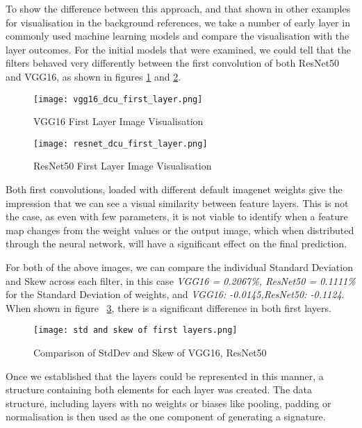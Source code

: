 To show the difference between this approach, and that shown in other examples for visualisation in the background references, we take a number of early layer in commonly used machine learning models and compare the visualisation with the layer outcomes. For the initial models that were examined, we could tell that the filters behaved very differently between the first convolution of both ResNet50 and VGG16, as shown in figures \ref{fig:vgg16_dcu_image} and \ref{fig:resnet50_dcu_image}.

\begin{figure}[!ht]
    \centering
    \texttt{[image: vgg16\_dcu\_first\_layer.png]}
    \caption{VGG16 First Layer Image Visualisation}
    \label{fig:vgg16_dcu_image}
\end{figure}

\begin{figure}[!ht]
    \centering
    \texttt{[image: resnet\_dcu\_first\_layer.png]}
    \caption{ResNet50 First Layer Image Visualisation}
    \label{fig:resnet50_dcu_image}
\end{figure}

Both first convolutions, loaded with different default imagenet weights give the impression that we can see a visual similarity between feature layers. This is not the case, as even with few parameters, it is not viable to identify when a feature map changes from the weight values or the output image, which when distributed through the neural network, will have a significant effect on the final prediction.

For both of the above images, we can compare the individual Standard Deviation and Skew across each filter, in this case \textit{VGG16 = 0.2067\%, ResNet50 = 0.1111\%} for the Standard Deviation of weights, and \textit{VGG16: -0.0145,ResNet50: -0.1124}. When shown in figure ~\ref{fig:firstlayermodelcomparison}, there is a significant difference in both first layers.

\begin{figure}[!ht]
    \centering
    \texttt{[image: std and skew of first layers.png]}
    \caption{Comparison of StdDev and Skew of VGG16, ResNet50}
    \label{fig:firstlayermodelcomparison}
\end{figure}

Once we established that the layers could be represented in this manner, a structure containing both elements for each layer was created. The data structure, including layers with no weights or biases like pooling, padding or normalisation is then used as the one component of generating a signature.

